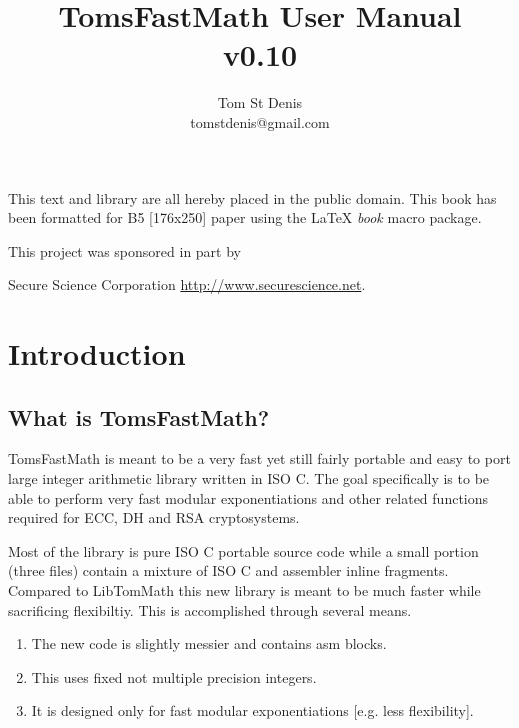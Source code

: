 \documentclass[b5paper]{book}
\begin{document}
\frontmatter
\pagestyle{empty}
\title{TomsFastMath User Manual \\ v0.10}
\author{Tom St Denis \\ tomstdenis@gmail.com}
\maketitle
This text and library are all hereby placed in the public domain.  This book has been formatted for B5 
[176x250] paper using the \LaTeX{} {\em book} macro package.

\vspace{13cm}

\begin{flushleft}This project was sponsored in part by  

Secure Science Corporation \url{http://www.securescience.net}.
\end{flushleft}

\tableofcontents
\listoffigures
\mainmatter
\pagestyle{headings}
\chapter{Introduction}
\section{What is TomsFastMath?}

TomsFastMath is meant to be a very fast yet still fairly portable and easy to port large
integer arithmetic library written in ISO C.  The goal specifically is to be able to perform
very fast modular exponentiations and other related functions required for ECC, DH and RSA
cryptosystems.

Most of the library is pure ISO C portable source code while a small portion (three files) contain
a mixture of ISO C and assembler inline fragments.  Compared to LibTomMath this new library is 
meant to be much faster while sacrificing flexibiltiy.  This is accomplished through several means.

\begin{enumerate}
   \item The new code is slightly messier and contains asm blocks.
   \item This uses fixed not multiple precision integers.  
   \item It is designed only for fast modular exponentiations [e.g. less flexibility].
\end{enumerate}
\end{document}
